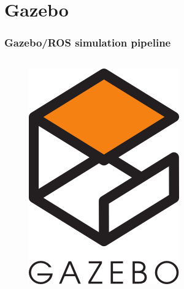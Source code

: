 \documentclass[aspectratio=169]{beamer}
\begin{document}

\section{Gazebo}

\begin{frame}

  \frametitle{Gazebo/ROS simulation pipeline}

  \begin{columns}[c]

    \begin{figure}
      \centering
      \includegraphics[width=0.5\textheight]{./fig/gazebo_logo.png}
    \end{figure}


  \end{columns}

\end{frame}
\end{document}

